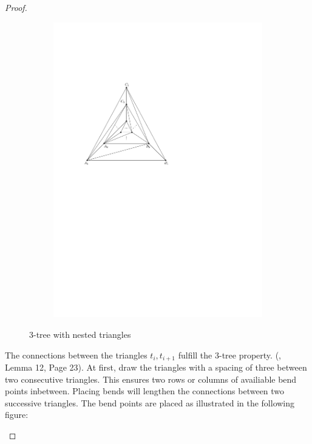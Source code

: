 \begin{proof}
\begin{figure}[H]
\begin{subfigure}{0.8\linewidth}
		\includegraphics[width=\textwidth,page=1]{drawings/3-tree.pdf}
	\end{subfigure}
	\caption{3-tree with nested triangles}\label{im:3trees-straight-line}
\end{figure}
	The connections between the triangles $t_i,t_{i+1}$ fulfill the 3-tree property. (\cite{DBLP:journals/jgaa/MondalNRA11}, Lemma 12, Page 23).
	At first, draw the triangles with a spacing of three between two consecutive triangles. This ensures two rows or columns of availiable bend points inbetween. Placing bends will lengthen the connections between two successive triangles. The bend points are placed as illustrated in the following figure:
		\begin{figure}[H]
		\centering
		\begin{subfigure}{0.8\linewidth}
			\centering

\end{subfigure}
\end{figure}
\end{proof}
